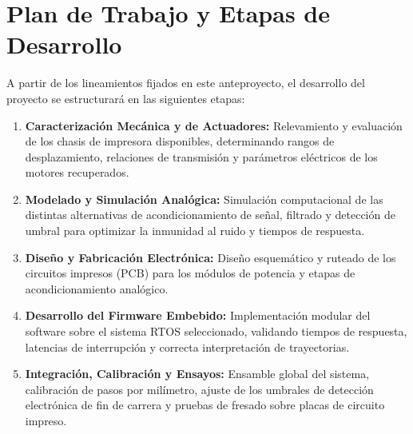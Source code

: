 \section{Plan de Trabajo y Etapas de Desarrollo}
\label{sec:pasos_futuros}

A partir de los lineamientos fijados en este anteproyecto, el desarrollo del proyecto se estructurará en las siguientes
etapas:
\begin{enumerate}
  \item \textbf{Caracterización Mecánica y de Actuadores:} Relevamiento y evaluación de los chasis de impresora disponibles,
    determinando rangos de desplazamiento, relaciones de transmisión y parámetros eléctricos de los motores recuperados.
  \item \textbf{Modelado y Simulación Analógica:} Simulación computacional de las distintas alternativas de acondicionamiento
    de señal, filtrado y detección de umbral para optimizar la inmunidad al ruido y tiempos de respuesta.
  \item \textbf{Diseño y Fabricación Electrónica:} Diseño esquemático y ruteado de los circuitos impresos (PCB) para los
    módulos de potencia y etapas de acondicionamiento analógico.
  \item \textbf{Desarrollo del Firmware Embebido:} Implementación modular del software sobre el sistema RTOS seleccionado,
    validando tiempos de respuesta, latencias de interrupción y correcta interpretación de trayectorias.
  \item \textbf{Integración, Calibración y Ensayos:} Ensamble global del sistema, calibración de pasos por milímetro,
    ajuste de los umbrales de detección electrónica de fin de carrera y pruebas de fresado sobre placas de circuito impreso.
\end{enumerate}
